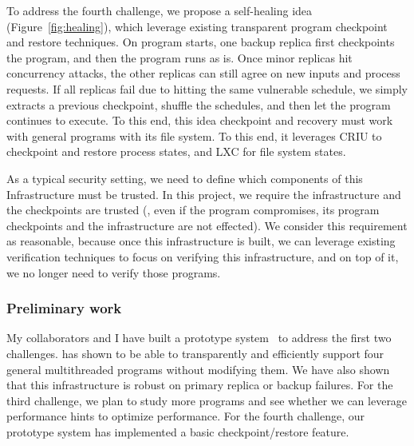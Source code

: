To address the fourth challenge, we propose a self-healing idea 
(Figure~\ref{fig:healing}), which leverage existing transparent program 
checkpoint and restore techniques. On program starts, one backup replica first 
checkpoints the program, and then the program runs as is. Once minor replicas 
hit concurrency attacks, the other replicas can still agree on new inputs and 
process requests. If all replicas fail due to hitting the same vulnerable 
schedule, we simply extracts a previous checkpoint, shuffle the schedules, and 
then let the program continues to execute. To this end, this idea checkpoint 
and recovery must work with general programs with its file system. To this end, 
it leverages CRIU to checkpoint and restore process states, and LXC for file 
system states.

As a typical security setting, we need to define which components of 
this Infrastructure must be trusted. In this project, we require the 
infrastructure and the checkpoints are trusted (\ie, even if the program 
compromises, its program checkpoints and the infrastructure are not effected). 
We consider this requirement as reasonable, because once this infrastructure is 
built, we can leverage existing verification techniques to focus on verifying 
this infrastructure, and on top of it, we no longer need to verify those 
programs.





\subsubsection{Preliminary work} \label{sec:defense-result}

My collaborators and I have built a prototype system~\cite{crane:sosp15} to 
address the first two challenges. \crane has shown to be able to transparently 
and efficiently support four general multithreaded programs without modifying 
them. We have also shown that this infrastructure is robust on primary replica 
or backup failures. For the third challenge, we plan to study more 
programs and see whether we can leverage performance hints to optimize 
performance. For the fourth challenge, our prototype system \crane has 
implemented a basic checkpoint/restore feature.

